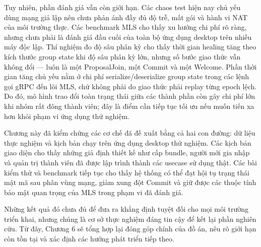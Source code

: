 \documentclass[../DoAn.tex]{subfiles}
\begin{document}
Tuy nhiên, phần đánh giá vẫn còn giới hạn. Các chaos test hiện nay chủ yếu dùng mạng giả lập nên chưa phản ánh đầy đủ độ trễ, mất gói và hành vi NAT của môi trường thực. Các benchmark MLS cho thấy xu hướng chi phí rõ ràng, nhưng chưa phải là đánh giá đầu cuối của toàn bộ ứng dụng desktop trên nhiều máy độc lập. Thí nghiệm đo độ sâu phân kỳ cho thấy thời gian healing tăng theo kích thước group state khi độ sâu phân kỳ lớn, nhưng số bước giao thức vẫn không đổi --- luôn là một ProposalJoin, một Commit và một Welcome. Phần thời gian tăng chủ yếu nằm ở chi phí serialize/deserialize group state trong các lệnh gọi gRPC đến lõi MLS, chứ không phải do giao thức phải replay từng epoch lệch. Do đó, mô hình trao đổi toàn trạng thái giữa các thành phần còn gây chi phí lớn khi nhóm rất đông thành viên; đây là điểm cần tiếp tục tối ưu nếu muốn tiến xa hơn khỏi phạm vi ứng dụng thử nghiệm.
	
Chương này đã kiểm chứng các cơ chế đã đề xuất bằng cả hai con đường: dữ liệu thực nghiệm và kịch bản chạy trên ứng dụng desktop thử nghiệm. Các kịch bản giao diện cho thấy những giả định thiết kế như cấp bundle, người mới gia nhập và quản trị thành viên đã được lập trình thành các usecase sử dụng thật. Các bài kiểm thử và benchmark tiếp tục cho thấy hệ thống có thể đạt hội tụ trạng thái mật mã sau phân vùng mạng, giảm xung đột Commit và giữ được các thuộc tính bảo mật quan trọng của MLS trong phạm vi đã đánh giá.
	
Những kết quả đó chưa đủ để đưa ra khẳng định tuyệt đối cho mọi môi trường triển khai, nhưng chúng là cơ sở thực nghiệm đáng tin cậy để kết lại phần nghiên cứu. Từ đây, Chương 6 sẽ tổng hợp lại đóng góp chính của đồ án, nêu rõ giới hạn còn tồn tại và xác định các hướng phát triển tiếp theo.
	
\end{document}
